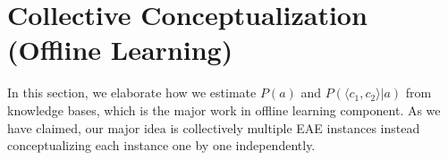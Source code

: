 %
%
%
%
%
%
%
%
%
%
%
%
%

\section{Collective Conceptualization (Offline Learning)}
In this section, we elaborate how we estimate $P(a)$ and $P( \langle c_{1},c_{2} \rangle |a)$ from knowledge bases, which is the major work in offline learning component. As we have claimed, our major idea is collectively multiple EAE instances instead conceptualizing each instance one by one independently.


